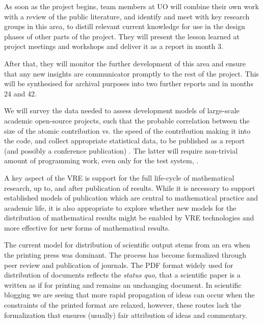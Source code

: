 \begin{workpackage}[id=social-aspects,wphases=0-48,
  title=Social Aspects,
  lead=UO,
  UORM=23,USHRM=18,USORM=6]
\begin{tasklist}
\begin{task}[title=Social Science Input to
    Design,id=social-input,lead=UO,PM=18, partners={UO,PS}]
As soon as the project begins, team members at UO will combine their
own work with a review of the public literature, and identify and
meet with key research groups in this area, to distill relevant
current knowledge for use in the design phases of other parts of the
project. They will  present the lesson
learned at project meetings and workshops and deliver it as a report
 in month 3.

After that, they will monitor the further development of this area and
ensure that any new insights are communicator promptly to the rest of
the project. This will be synthesised for archival purposes into two
further reports 
 and 
 in months 24 and 42.

We will survey the data needed to assess development models of
large-scale academic open-source projects, such that the probable
correlation between the size of the atomic contribution vs. the speed
of the contribution making it into the code, and collect appropriate
statistical data, to be published as a report (and possibly a conference
publication) . 
The latter will require non-trivial amount of
programming work, even only for the test system, \Sage.
\end{task}

\begin{task}[title=Implications of VREs for Publication,id=social-output,lead=USH,PM=12,partners={UO}]
  A key aspect of the \TheProject VRE is support for the full
  life-cycle of mathematical research, up to, and after publication of
  results. While it is necessary to support established models of
  publication which are central to mathematical practice and academic
  life, it is also appropriate to explore whether new models for the
  distribution of mathematical results might be enabled by VRE
  technologies and more effective for new forms of mathematical
  results.

  The current model for distribution of scientific output stems from
  an era when the printing press was dominant. The process has become
  formalized through peer review and publication of journals. The PDF
  format widely used for distribution of documents reflects the
  \textit{status quo}, that a scientific paper is a written as if for
  printing and remains an unchanging document. In scientific blogging
  we are seeing that more rapid propagation of ideas can occur when
  the constraints of the printed format are relaxed, however, these
  routes lack the formalization that ensures (usually) fair
  attribution of ideas and commentary.


\end{task}
\end{tasklist}
\end{workpackage}
